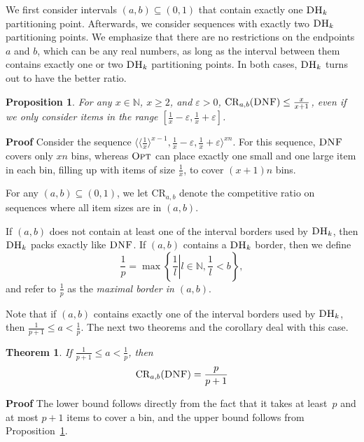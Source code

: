 \documentclass[11pt]{article}
\newtheorem{xtheorem}{Theorem}
\newtheorem{xproposition}{Proposition}
\newenvironment{theorem}{\begin{xtheorem}\rm}{\end{xtheorem}}
\newenvironment{proposition}{\begin{xproposition}\rm}{\end{xproposition}}
\newenvironment{proof}{\begin{trivlist}\item[]{\bf Proof }}{\hspace*{\fill}\raisebox{-1pt}{\boldmath$\Box$}\end{trivlist}}
\newcommand{\OPT}{\ensuremath{\operatorname{\textsc{Opt}}}\xspace}
\newcommand{\DNF}{\ensuremath{\operatorname{\textsc{DNF}}}\xspace}
\newcommand{\DHk}{{\ensuremath{\textsc{DH}_k}}\xspace}
\newcommand{\SEQ}[1]{\langle #1 \rangle}
\newcommand{\CRab}[1]{\ensuremath{\mathrm{CR}_{a,b}(#1)}\xspace}
\newcommand{\CRabu}{\ensuremath{\mathrm{CR}_{a,b}}\xspace}
\newcommand{\p}{p}
\newcommand{\eps}{\ensuremath{\varepsilon}\xspace}
\begin{document}
We first consider intervals $(a,b)\subseteq
(0,1)$ that contain exactly one \DHk partitioning point.
Afterwards, we consider sequences with exactly two \DHk partitioning points.
We emphasize that there are no restrictions on the endpoints $a$ and $b$,
which can be any real numbers,
as long as the interval between them contains exactly one or two \DHk partitioning points.
In both cases, \DHk turns out to have the better ratio.

\begin{proposition}
\label{proposition-basic-dnf}
For any $x\in\mathbb{N}$, $x \geq 2$, and $\varepsilon > 0$,
$\CRab{\DNF} \leq \frac{x}{x+1}$, even if we
only consider items in the range
$[\frac{1}{x}-\eps,\frac{1}{x}+\eps]$.
\end{proposition}
\begin{proof}
Consider the sequence 
$\SEQ{\SEQ{\frac{1}{x}}^{x-1}, \frac{1}{x} - \eps, \frac{1}{x} + \eps}^{xn}$.
For this sequence, \DNF covers only $xn$ bins, whereas \OPT can
place exactly one small and one large item in each bin, filling up with
items of size $\frac{1}{x}$, to cover $(x+1)n$ bins.
\end{proof}

For any $(a,b) \subseteq (0,1)$, we let
\CRabu denote the competitive ratio on
sequences where all item sizes are in $(a,b)$.

If $(a,b)$ does not contain at least one of the interval borders
used by \DHk, then \DHk packs exactly like \DNF.
If $(a,b)$ contains a \DHk border, then we define 
 $$\frac{1}{\p} = 
 \max\left\{\frac{1}{l} \left\vert l \in \mathbb{N}, \frac{1}{l}
 < b\right.\right\},$$
and refer to $\frac{1}{\p}$ as the {\em maximal border in $(a,b)$}.

Note that if $(a,b)$ contains exactly one of the interval borders
used by \DHk, then $\frac{1}{\p+1}\leq a<\frac{1}{\p}$.
The next two theorems and the corollary deal with this case.

\begin{theorem}\label{lemma-DNF-2int}
If $\frac{1}{\p+1}\leq a<\frac{1}{\p}$, then 
\[\CRab{\DNF} = \frac{\p}{\p+1}\]
\end{theorem}
\begin{proof}
The lower bound follows directly from the fact that it takes at 
least~$\p$ and at most $\p+1$ items to cover a bin,
and the upper bound follows from Proposition~\ref{proposition-basic-dnf}.
\end{proof}
\end{document}
